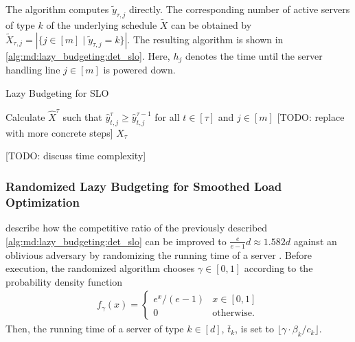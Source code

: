 The algorithm computes $\widetilde{y}_{\tau,j}$ directly. The corresponding number of active servers of type $k$ of the underlying schedule $\widetilde{X}$ can be obtained by $\widetilde{X}_{\tau,j} = |\{j \in [m] \mid \widetilde{y}_{\tau,j} = k\}|$. The resulting algorithm is shown in \autoref{alg:md:lazy_budgeting:det_slo}. Here, $h_j$ denotes the time until the server handling line $j \in [m]$ is powered down.

\begin{algorithm}
    \caption{Lazy Budgeting for SLO \cite{Albers2021}}\label{alg:md:lazy_budgeting:det_slo}
    Calculate $\hat{X}^{\tau}$ such that $\hat{y}_{t,j}^{\tau} \geq \hat{y}_{t,j}^{\tau-1}$ for all $t \in [\tau]$ and $j \in [m]$ [TODO: replace with more concrete steps]\;
    \Return $X_{\tau}$\;
\end{algorithm}

[TODO: discuss time complexity]

\subsubsection{Randomized Lazy Budgeting for Smoothed Load Optimization}

\citeauthor*{Albers2021} describe how the competitive ratio of the previously described \autoref{alg:md:lazy_budgeting:det_slo} can be improved to $\frac{e}{e-1}d \approx 1.582d$ against an oblivious adversary by randomizing the running time of a server \cite{Albers2021}. Before execution, the randomized algorithm chooses $\gamma \in [0,1]$ according to the probability density function \begin{align*}
    f_{\gamma}(x) = \begin{cases}
        e^x / (e-1) & x \in [0,1] \\
        0 & \text{otherwise}.
    \end{cases}
\end{align*} Then, the running time of a server of type $k \in [d]$, $\bar{t}_k$, is set to $\lfloor \gamma \cdot \beta_k / c_k \rfloor$.

